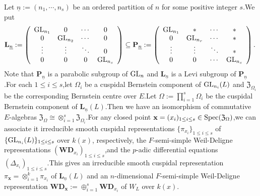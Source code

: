 \documentclass[SecEq,CM,GP]{degruyter-crelle} %
\theoremstyle{plain}
\newcommand{\EndO}{{\rm End}}
\newcommand{\GLN}{{\rm GL}}
\newcommand{\ind}{{\rm Ind}}
\newcommand{\Spec}{\rm Spec}
\newcommand{\ul}{\underline}
\newcommand{\wdre}{{\textbf{WD}}}
\newcommand{\bL}{{\mathbf{L}}}
\newcommand{\bP}{{\mathbf{P}}}
\newcommand{\bx}{{\mathbf{x}}}
\newcommand{\cO}{\mathcal O}
\newcommand{\FZ}{{\mathfrak{Z}}}
\begin{document}
Let $\ul{n}:=(n_1,\cdots,n_s)$ be an ordered partition  of $n$ for some positive integer $s$.\;We put \[\bL_{\ul{n}}:=\left(\begin{array}{cccc}
\GLN_{n_1} & 0 & \cdots & 0 \\
0 & \GLN_{n_2} & \cdots & 0 \\
\vdots & \vdots & \ddots & 0 \\
0 & 0 & 0 & \GLN_{n_s} \\
\end{array}\right)\subseteq \bP_{\ul{n}}:=\left(\begin{array}{cccc}
\GLN_{n_1} & \ast & \cdots & \ast \\
0 & \GLN_{n_r} & \cdots & \ast \\
\vdots & \vdots & \ddots & \ast \\
0 & 0 & \cdots & \GLN_{n_s} \\
\end{array}\right).\;\]
Note that $\bP_{\ul{n}}$ is a parabolic subgroup of $\GLN_{n}$ and  $\bL_{\ul{n}}$ is a Levi subgroup of $\bP_{\ul{n}}$.\;For each $1\leq i\leq s$,\;let $\Omega_i$ be a cuspidal  Bernstein component of $\GLN_{n_i}(L)$ and $\FZ_{\Omega_i}$ be the corresponding Bernstein centre over $E$.\;Let $\Omega:=\prod_{i=1}^s\Omega_i$ be the cuspidal Bernstein component of $\bL_{\ul{n}}(L)$.\;Then we have an isomorphism of commutative $E$-algebras $\FZ_{\Omega}\cong\otimes_{i=1}^s\FZ_{\Omega_i}$.\;For any closed point $\bx=(x_i)_{1\leq i\leq s}\in \Spec(\FZ_{\Omega})$,\;we can associate it irreducible smooth  cuspidal representations $\{\pi_{x_i}\}_{1\leq i\leq s}$ of $\{\GLN_{n_i}(L)\}_{1\leq i\leq s}$ over $k(x)$, respectively, the $F$-semi-simple Weil-Deligne representations $(\wdre_{x_i})_{1\leq i\leq s}$,\;and the $p$-adic differential equations $(\Delta_{x_i})_{1\leq i\leq s}$.\;This gives an irreducible smooth  cuspidal representation $\pi_{\bx}=\otimes_{i=1}^k\pi_{x_i}$ of  $\bL_{\ul{n}}(L)$ and an $n$-dimensional $F$-semi-simple Weil-Deligne representation $\wdre_{\bx}:=\oplus_{i=1}^s\wdre_{x_i}$ of $W_L$ over $k(x)$.\;

\end{document}
